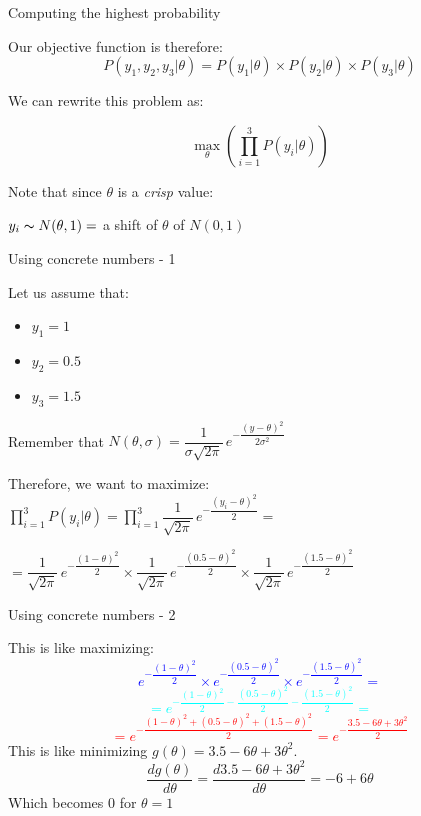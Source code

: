 \documentclass{beamer}
\begin{document}
\begin{frame}
{\centerline{Computing the highest probability}}
Our objective function is therefore:
$$P(y_1, y_2, y_3 | \theta) = P(y_1 | \theta) \times P(y_2 | \theta) \times P(y_3 | \theta)$$

We can rewrite this problem as:

$$ \max_{\theta}(\prod_{i=1}^3 P(y_i | \theta)) $$
\vspace*{0.2cm}

Note that since $\theta$ is a \textit{crisp} value:
\centerline{
$ y_i \thicksim N(\theta,1) = $ a shift of $\theta$ of $N(0,1) $}


\end{frame}

\begin{frame}
{\centerline{Using concrete numbers - 1}}
Let us assume that:
\begin{itemize}
\item $y_1 = 1$
\item $y_2 = 0.5$
\item $y_3 = 1.5$
\end{itemize}
Remember that $N(\theta,\sigma) = \dfrac 1 {\sigma \sqrt{2 \pi} } \, e^{-\dfrac { \left({y - \theta}\right)^2} {2 \sigma^2} }$\\
\vspace{0.5cm}

Therefore, we want to maximize:\\
$ \prod_{i=1}^3 P(y_i | \theta) = \prod_{i=1}^3 \dfrac 1 {\sqrt{2 \pi} } \, e^{-\dfrac { \left({y_i - \theta}\right)^2} {2} } = $\\
\vspace{0.5cm}

$= \dfrac 1 {\sqrt{2 \pi} } \, e^{-\dfrac { \left({1 - \theta}\right)^2} {2} } \times  \dfrac 1 {\sqrt{2 \pi} } \, e^{-\dfrac { \left({0.5 - \theta}\right)^2} {2} } \times  \dfrac 1 {\sqrt{2 \pi} } \, e^{-\dfrac { \left({1.5 - \theta}\right)^2} {2} }$

\end{frame}

\begin{frame}
{\centerline{Using concrete numbers - 2}}

This is like maximizing:
\textcolor{blue}{
$$e^{-\dfrac { \left({1 - \theta}\right)^2} {2} } \times e^{-\dfrac { \left({0.5 - \theta}\right)^2} {2} } \times e^{-\dfrac { \left({1.5 - \theta}\right)^2} {2} } = $$
}\textcolor{cyan}{
$$ = e^{-\dfrac { \left({1 - \theta}\right)^2} {2} -\dfrac { \left({0.5 - \theta}\right)^2} {2} -\dfrac { \left({1.5 - \theta}\right)^2} {2}} = $$
}\textcolor{red}{
$$ = e^{-\dfrac { ({1 - \theta})^2 + ({0.5 - \theta})^2 + ({1.5 - \theta})^2 } {2} } = e^{-\dfrac { 3.5 - 6 \theta + 3 \theta ^2 } {2} } $$
}
This is like minimizing $ g(\theta) = 3.5 - 6 \theta + 3 \theta ^2 $.
$$\frac{d g(\theta)}{d \theta} = \frac{d 3.5 - 6 \theta + 3 \theta ^2}{d \theta} = -6 + 6 \theta$$
Which becomes 0 for $\theta = 1$

\end{frame}
\end{document}
